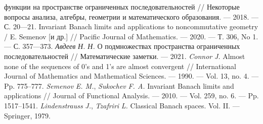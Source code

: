 \documentclass[a4paper,14pt]{article} %
\theoremstyle{plain}
\begin{document}
\begin{thebibliography}{99}
функции на пространстве ограниченных последовательностей // Некоторые
вопросы анализа, алгебры, геометрии и математического образования. —
2018. — С. 20—21.
%
Invariant Banach limits and applications to noncommutative geometry /
E. Semenov [и др.] // Pacific Journal of Mathematics. — 2020. — Т. 306, No 1. —
С. 357—373.
%
\emph{Авдеев} \emph{Н. Н.} О подмножествах пространства
ограниченных последовательностей // Математические заметки. — 2021.
%
\emph{Connor} \emph{J.} Almost none of the sequences of 0’s and 1’s are
almost convergent // International Journal of Mathematics and Mathematical
Sciences. — 1990. — Vol. 13, no. 4. — Pp. 775–777.
%
\emph{Semenov} \emph{E. M.}, \emph{Sukochev} \emph{F. A.} Invariant
Banach limits and applications // Journal of Functional Analysis. — 2010. —
Vol. 259, no. 6. — Pp. 1517–1541.
%
\emph{Lindenstrauss} \emph{J.}, \emph{Tzafriri} \emph{L.} Classical
Banach spaces. Vol. II. — Springer, 1979.
\end{thebibliography}
\end{document}
